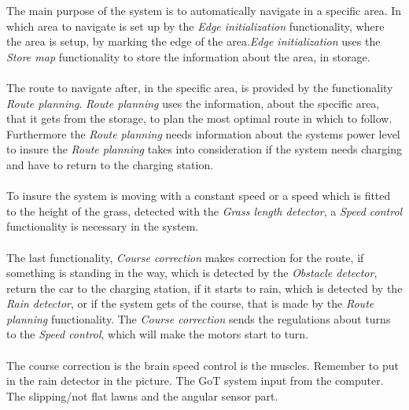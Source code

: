 \noindent
The main purpose of the system is to automatically navigate in a specific area. In which area to navigate is set up by the \textit{Edge initialization} functionality, where the area is setup, by marking the edge of the area.\textit{Edge initialization} uses the \textit{Store map} functionality to store the information about the area, in storage. \\\\ 
The route to navigate after, in the specific area, is provided by the functionality \textit{Route planning}. \textit{Route planning} uses the information, about the specific area, that it gets from the storage, to plan the most optimal route in which to follow. Furthermore the \textit{Route planning} needs information about the systems power level to insure the \textit{Route planning} takes into consideration if the system needs charging and have to return to the charging station.\\\\
To insure the system is moving with a constant speed or a speed which is fitted to the height of the grass, detected with the \textit{Grass length detector}, a \textit{Speed control} functionality is necessary in the system.\\\\
The last functionality, \textit{Course correction} makes correction for the route, if something is standing in the way, which is detected by the \textit{Obstacle detector}, return the car to the charging station, if it starts to rain, which is detected by the \textit{Rain detector}, or if the system gets of the course, that is made by the \textit{Route planning} functionality.
The \textit{Course correction} sends the regulations about turns to the \textit{Speed control}, which will make the motors start to turn.\\\\
The course correction is the brain speed control is the muscles. 
Remember to put in the rain detector in the picture.
The GoT system input from the computer.
The slipping/not flat lawns and the angular sensor part.



 
 